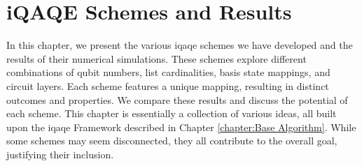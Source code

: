 
\chapter{iQAQE Schemes and Results}
\label{chapter:Schemes_and_Results}






In this chapter, we present the various \acrshort{iqaqe} schemes we have developed and the results of their numerical simulations. These schemes explore different combinations of qubit numbers, list cardinalities, basis state mappings, and circuit layers. Each scheme features a unique mapping, resulting in distinct outcomes and properties. We compare these results and discuss the potential of each scheme. This chapter is essentially a collection of various ideas, all built upon the \acrshort{iqaqe} Framework described in Chapter \ref{chapter:Base Algorithm}. While some schemes may seem disconnected, they all contribute to the overall goal, justifying their inclusion.

